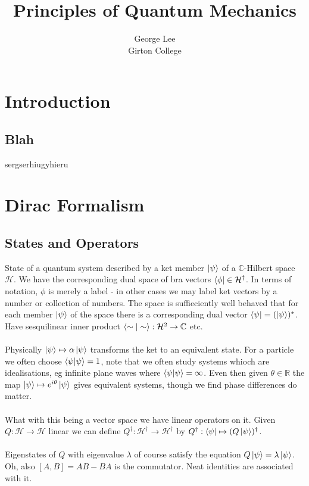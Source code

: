 \documentclass{article}
\title{Principles of Quantum Mechanics}
\author{George Lee\\Girton College}
\begin{document}
\maketitle
\section{Introduction}
\subsection{Blah}
sergserhiugyhieru
\section{Dirac Formalism}
\subsection{States and Operators}
State of a quantum system described by a ket member $\ket{\psi}$ of a $\mathbb{C}$-Hilbert space $\mathcal{H}$.  We have the corresponding dual space of bra vectors $\bra{\phi}\in\mathcal{H}^\dagger$.  In terms of notation, $\phi$ is merely a label - in other cases we may label ket vectors by a number or collection of numbers.  The space is suffieciently well behaved that for each member $\ket{\psi}$ of the space there is a corresponding dual vector $\bra{\psi}=(\ket{\psi})^*$.  Have sesquilinear inner product $\braket{\sim|\sim}:\mathcal{H}^2\rightarrow\mathbb{C}$ etc.
\\
\\
Physically $\ket{\psi}\mapsto\alpha\ket{\psi}$ transforms the ket to an equivalent state.  For a particle we often choose $\braket{\psi|\psi}=1$, note that we often study systems whioch are idealisations, eg infinite plane waves where $\braket{\psi|\psi}=\infty$.  Even then given $\theta\in\mathbb{R}$ the map $\ket{\psi}\mapsto e^{i\theta}\ket{\psi}$ gives equivalent systems, though we find phase differences do matter.
\\
\\
What with this being a vector space we have linear operators on it.  Given $Q:\mathcal{H}\rightarrow\mathcal{H}$ linear we can define $Q^\dagger:\mathcal{H}^\dagger\rightarrow\mathcal{H}^\dagger$ by $Q^\dagger:\bra{\psi}\mapsto(Q\ket{\psi})^\dagger$.
\\
\\
Eigenstates of $Q$ with eigenvalue $\lambda$ of course satisfy the equation $Q\ket{\psi}=\lambda\ket{\psi}$.  Oh, also $[A,B]=AB-BA$ is the commutator.  Neat identities are associated with it.
\end{document}
